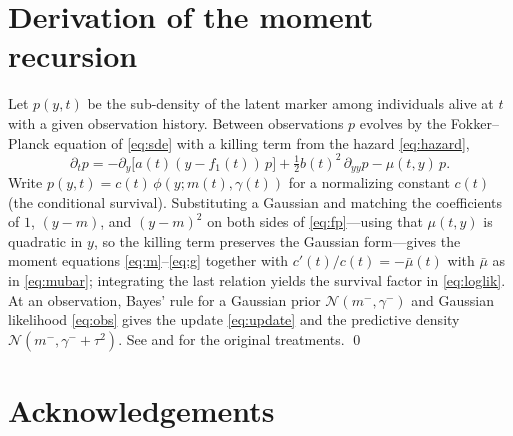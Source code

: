 \documentclass[review,3p,times]{elsarticle}
\newcommand{\fone}{f_1}
\begin{document}
\appendix
\section{Derivation of the moment recursion}\label{app:deriv}

Let $p(y,t)$ be the sub-density of the latent marker among individuals alive at
$t$ with a given observation history. Between observations $p$ evolves by the
Fokker--Planck equation of \eqref{eq:sde} with a killing term from the hazard
\eqref{eq:hazard},
\begin{equation}\label{eq:fp}
  \partial_t p = -\partial_y\!\bigl[a(t)(y-\fone(t))\,p\bigr]
                 + \tfrac12 b(t)^2\,\partial_{yy}p
                 - \mu(t,y)\,p .
\end{equation}
Write $p(y,t)=c(t)\,\phi(y;m(t),\gamma(t))$ for a normalizing constant $c(t)$ (the
conditional survival). Substituting a Gaussian and matching the coefficients of
$1$, $(y-m)$, and $(y-m)^2$ on both sides of \eqref{eq:fp}---using that
$\mu(t,y)$ is quadratic in $y$, so the killing term preserves the Gaussian
form---gives the moment equations \eqref{eq:m}--\eqref{eq:g} together with
$c'(t)/c(t)=-\bar\mu(t)$ with $\bar\mu$ as in \eqref{eq:mubar}; integrating the last
relation yields the survival factor in \eqref{eq:loglik}. At an observation, Bayes'
rule for a Gaussian prior $\mathcal{N}(m^-,\gamma^-)$ and Gaussian likelihood
\eqref{eq:obs} gives the update \eqref{eq:update} and the predictive density
$\mathcal{N}(m^-,\gamma^-+\tau^2)$. See \citet{WoodburyManton1977} and
\citet{Yashin2007} for the original treatments. \qed

\section*{Acknowledgements}



\end{document}
